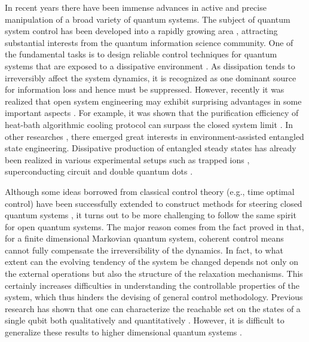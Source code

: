 \documentclass[prl,aps,twocolumn, reprint, amsmath,amssymb,showpacs,superscriptaddress]{revtex4}
\begin{document}

\maketitle

In recent years there have been immense advances in active and precise manipulation of a broad variety of quantum systems. The subject of quantum system control has been developed into a rapidly growing area \cite{DP}, attracting substantial interests from the quantum information science community. One of the fundamental tasks is to design reliable control techniques for quantum systems that are exposed to a dissipative environment \cite{KKSS}.
As dissipation tends to irreversibly affect the system dynamics, it is recognized as one dominant source for information loss and hence must be suppressed.
However, recently it was realized that open system engineering may exhibit surprising advantages in some important aspects \cite{RMBL, Entanglement, SW}. For example, it was shown that the purification efficiency of heat-bath algorithmic cooling protocol can surpass the closed system limit \cite{RMBL}. In other researches \cite{Entanglement}, there emerged great interests in environment-assisted entangled state engineering. Dissipative production of entangled steady states has already been realized
in various experimental setups such as trapped ions \cite{Lin}, superconducting circuit \cite{RTJS} and double quantum dots \cite{SKVCG}.


Although some ideas borrowed from classical control theory (e.g., time optimal control) have been successfully extended to construct methods for steering closed quantum systems \cite{RKGD}, it turns out to be more challenging to follow the same spirit for open quantum systems.
The major reason  comes from the fact proved in \cite{A} that, for a finite dimensional Markovian quantum system, coherent control means cannot fully compensate the irreversibility of the dynamics. In fact, to what extent can the evolving tendency of the system be changed depends not only on the external operations but also the structure of the relaxation mechanisms. This certainly increases difficulties in understanding the controllable properties of the system, which thus hinders the devising of general control methodology.
Previous research has shown that one can characterize the reachable set on the states of a single qubit both qualitatively \cite{A} and quantitatively \cite{Y, RBR}.
However, it is difficult to generalize these results to higher dimensional quantum systems \cite{R}.
\end{document}
